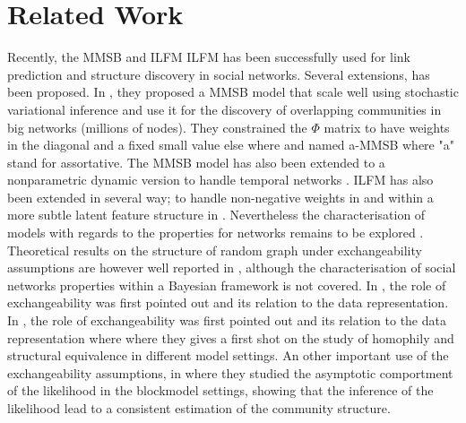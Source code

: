 \section{Related Work}



Recently, the MMSB \cite{MMSB} and ILFM {ILFM} has been successfully used for link prediction and structure discovery in social networks. Several extensions, has been proposed. In \cite{AMMSB}, they proposed a MMSB model that scale well using stochastic variational inference and use it for the discovery of overlapping communities in big networks (millions of nodes). They constrained the $\Phi$ matrix  to have weights in the diagonal and a fixed small value else where and named a-MMSB where "a" stand for assortative. The MMSB model has also been extended to a nonparametric dynamic version to handle temporal networks \cite{fan2015dynamic}. ILFM has also been extended in several way; to handle non-negative weights in \cite{IMRM} and within a more subtle latent feature structure in \cite{ILAM}. Nevertheless the characterisation of models with regards to the properties for networks remains to be explored \cite{jacobs2014unified}. Theoretical results on the structure of random graph under exchangeability assumptions are however well reported in \cite{orbanz2015bayesian}, although the characterisation of social networks properties within a Bayesian framework is not covered. In \cite{hoff2008modeling}, the role of exchangeability was first pointed out and its relation to the data representation. In \cite{hoff2008modeling}, the role of exchangeability was first pointed out and its relation to the data representation where  where they gives a first shot on the study of homophily and structural equivalence in different model settings. An other important use of the exchangeability assumptions, in \cite{bickel2009nonparametric} where they studied the asymptotic comportment of the likelihood in the blockmodel settings, showing that the inference of the likelihood lead to a consistent estimation of the community structure.

